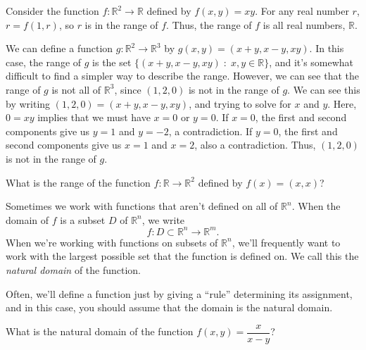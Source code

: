 \documentclass{ximera}
\begin{document}
\begin{example}
Consider the function $f:\mathbb{R}^2\rightarrow\mathbb{R}$ defined by $f(x,y) = xy$. For any real number $r$, $r = f(1,r)$, so $r$ is in the range of $f$. Thus, the range of $f$ is all real numbers, $\mathbb{R}$.

We can define a function $g:\mathbb{R}^2\rightarrow\mathbb{R}^3$ by $g(x,y) = (x+y, x-y, xy)$. In this case, the range of $g$ is the set $\{(x+y,x-y,xy)\;:\;x,y\in\mathbb{R}\}$, and it's somewhat difficult to find a simpler way to describe the range. However, we can see that the range of $g$ is not all of $\mathbb{R}^3$, since $(1,2,0)$ is not in the range of $g$. We can see this by writing $(1,2,0) = (x+y,x-y,xy)$, and trying to solve for $x$ and $y$. Here, $0=xy$ implies that we must have $x=0$ or $y=0$. If $x=0$, the first and second components give us $y=1$ and $y=-2$, a contradiction. If $y=0$, the first and second components give us $x=1$ and $x=2$, also a contradiction. Thus, $(1,2,0)$ is not in the range of $g$.
\end{example}

\begin{problem}
What is the range of the function $f:\mathbb{R}\rightarrow \mathbb{R}^2$ defined by $f(x) = (x,x)$?
\begin{multipleChoice}
\end{multipleChoice}
\end{problem}

Sometimes we work with functions that aren't defined on all of $\mathbb{R}^n$. When the domain of $f$ is a subset $D$ of $\mathbb{R}^n$, we write
\[
f:D\subset\mathbb{R}^n\rightarrow\mathbb{R}^m.
\]
When we're working with functions on subsets of $\mathbb{R}^n$, we'll frequently want to work with the largest possible set that the function is defined on. We call this the \emph{natural domain} of the function.

Often, we'll define a function just by giving a ``rule'' determining its assignment, and in this case, you should assume that the domain is the natural domain.

\begin{problem}
What is the natural domain of the function $f(x,y) = \dfrac{x}{x-y}$?
\begin{multipleChoice}
\end{multipleChoice}
\end{problem}
\end{document}
